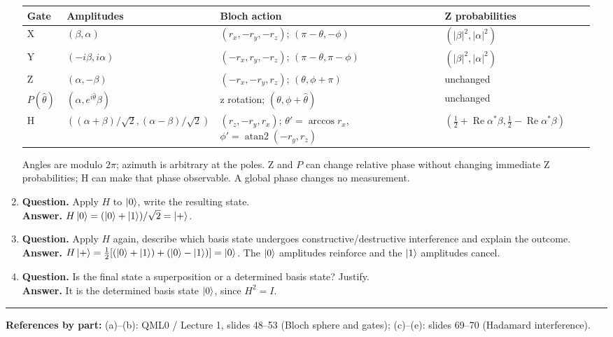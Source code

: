 \documentclass[
  11pt]{article}
\newcommand{\pagereferences}[1]{%
  \vfill
  \noindent\rule{\textwidth}{0.3pt}\par
  {\scriptsize\textbf{References by part:} #1\par}
}
\begin{document}
\begin{enumerate}[label=\textbf{(\alph*)},leftmargin=*,itemsep=1pt,topsep=1pt,parsep=0pt]
\begin{center}\scriptsize
\setlength{\tabcolsep}{2pt}\renewcommand{\arraystretch}{1.0}
\begin{tabular}{@{}p{0.07\linewidth}p{0.20\linewidth}p{0.43\linewidth}p{0.27\linewidth}@{}}
\toprule
Gate & Amplitudes & Bloch action & Z probabilities \\
\midrule
X & \((\beta,\alpha)\) & \((r_x,-r_y,-r_z)\); \((\pi-\theta,-\phi)\) & \((|\beta|^2,|\alpha|^2)\) \\
Y & \((-i\beta,i\alpha)\) & \((-r_x,r_y,-r_z)\); \((\pi-\theta,\pi-\phi)\) & \((|\beta|^2,|\alpha|^2)\) \\
Z & \((\alpha,-\beta)\) & \((-r_x,-r_y,r_z)\); \((\theta,\phi+\pi)\) & unchanged \\
\(P(\hat\theta)\) & \((\alpha,e^{i\hat\theta}\beta)\) & z rotation; \((\theta,\phi+\hat\theta)\) & unchanged \\
H & \(((\alpha+\beta)/\sqrt2,(\alpha-\beta)/\sqrt2)\) & \((r_z,-r_y,r_x)\); \(\theta'=\arccos r_x\), \(\phi'=\operatorname{atan2}(-r_y,r_z)\) & \((\tfrac12+\operatorname{Re}\alpha^*\beta,\tfrac12-\operatorname{Re}\alpha^*\beta)\) \\
\bottomrule
\end{tabular}\end{center}
Angles are modulo \(2\pi\); azimuth is arbitrary at the poles. Z and \(P\) can change relative phase without changing immediate Z probabilities; H can make that phase observable. A global phase changes no measurement.
\item \textbf{Question.} Apply \(H\) to \(\ket{0}\), write the resulting state.\\
\textbf{Answer.} \(H\ket{0}=(\ket{0}+\ket{1})/\sqrt2=\ket{+}\).
\item \textbf{Question.} Apply \(H\) again, describe which basis state undergoes constructive/destructive interference and explain the outcome.\\
\textbf{Answer.} \(H\ket{+}=\tfrac12[(\ket{0}+\ket{1})+(\ket{0}-\ket{1})]=\ket{0}\). The \(\ket{0}\) amplitudes reinforce and the \(\ket{1}\) amplitudes cancel.
\item \textbf{Question.} Is the final state a superposition or a determined basis state? Justify.\\
\textbf{Answer.} It is the determined basis state \(\ket{0}\), since \(H^2=I\).
\end{enumerate}
\normalsize
\pagereferences{(a)--(b): QML0 / Lecture 1, slides 48--53 (Bloch sphere and gates); (c)--(e): slides 69--70 (Hadamard interference).}
\end{document}
